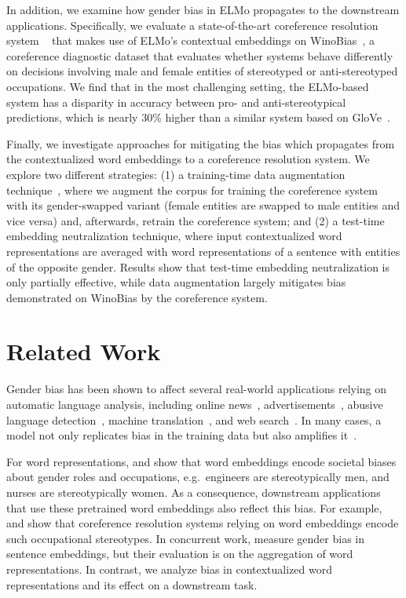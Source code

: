 \documentclass[11pt,a4paper]{article}
\begin{document}
In addition, we examine how gender bias in ELMo propagates to the downstream applications. Specifically, we evaluate a state-of-the-art coreference resolution system ~\cite{lee2018higher} that makes use of ELMo's contextual embeddings on WinoBias~\cite{ZWYOC18}, a coreference diagnostic dataset that evaluates whether systems behave differently on decisions involving male and female entities of stereotyped or anti-stereotyped occupations.
We find that in the most challenging setting, the ELMo-based system has a disparity in accuracy between pro- and anti-stereotypical predictions, which is nearly 30\% higher than a similar system based on GloVe~\cite{lee2017end}.


Finally, we investigate approaches for mitigating the bias which propagates from the contextualized word embeddings to a coreference resolution system.
We explore two different strategies: (1) a training-time data augmentation technique~\cite{ZWYOC18}, where we augment the corpus for training the coreference system with its gender-swapped variant (female entities are swapped to male entities and vice versa) and, afterwards, retrain the coreference system; and (2) a test-time embedding neutralization technique, where input contextualized word representations are averaged with word representations of a sentence with entities of the opposite gender.
Results show that test-time embedding neutralization is only partially effective, while data augmentation largely mitigates bias demonstrated on WinoBias by the coreference system.


\section{Related Work}



Gender bias has been shown to affect several real-world applications relying on automatic language analysis, including online news~\cite{ross2011women}, advertisements~\cite{sweeney2013discrimination}, abusive language detection~\cite{park2018reducing}, machine translation~\cite{font2019equalizing,Vanmassenhove2018getting}, and web search~\cite{kay2015unequal}. In many cases, a model not only replicates bias in the training data but also amplifies it~\cite{ZWYOC17}.

For word representations,  and  show that word embeddings encode societal biases about gender roles and occupations, e.g.~engineers are stereotypically men, and nurses are stereotypically women.
As a consequence, downstream applications that use these pretrained word embeddings also reflect this bias.
For example,  and  show that coreference resolution systems relying on word embeddings encode such occupational stereotypes.
In concurrent work, \citet{may2019measuring} measure gender bias in sentence embeddings, but their evaluation is on the aggregation of word representations. In contrast, we analyze bias in contextualized word representations and its effect on a downstream task.
\end{document}
